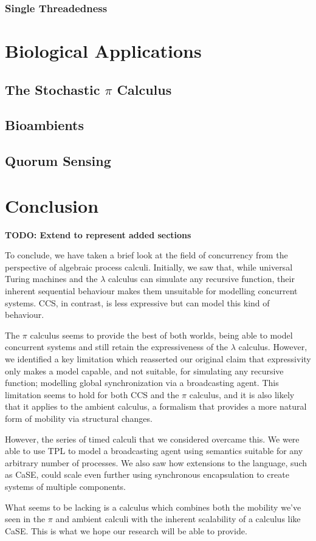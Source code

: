 \subsubsection{Single Threadedness}

\section{Biological Applications}
\label{bioapps}

\subsection{The Stochastic $\pi$ Calculus}

\subsection{Bioambients}

\subsection{Quorum Sensing}
\label{quorumsensing}

\section{Conclusion}

\textbf{TODO: Extend to represent added sections}

To conclude, we have taken a brief look at the field of concurrency from
the perspective of algebraic process calculi.  Initially, we saw that,
while universal Turing machines and the $\lambda$ calculus can simulate
any recursive function, their inherent sequential behaviour makes them
unsuitable for modelling concurrent systems.  CCS, in contrast, is less
expressive but can model this kind of behaviour.

The $\pi$ calculus seems to provide the best of both worlds, being able
to model concurrent systems and still retain the expressiveness of the
$\lambda$ calculus.  However, we identified a key limitation which
reasserted our original claim that expressivity only makes a model
capable, and not suitable, for simulating any recursive function;
modelling global synchronization via a broadcasting agent.  This
limitation seems to hold for both CCS and the $\pi$ calculus, and it is
also likely that it applies to the ambient calculus, a formalism that
provides a more natural form of mobility via structural changes.

However, the series of timed calculi that we considered overcame this.
We were able to use TPL to model a broadcasting agent using semantics
suitable for any arbitrary number of processes.  We also saw how
extensions to the language, such as CaSE, could scale even further using
synchronous encapsulation to create systems of multiple components.

What seems to be lacking is a calculus which combines both the mobility
we've seen in the $\pi$ and ambient calculi with the inherent
scalability of a calculus like CaSE.  This is what we hope our research
will be able to provide.


